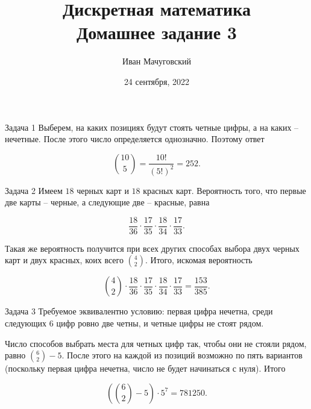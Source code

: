 \documentclass{article}
\date{24 сентября, 2022}
\title{Дискретная математика \\ \Large Домашнее задание 3}
\author{Иван Мачуговский}
\begin{document}
	\maketitle

	\begin{section}{Задача 1}
		Выберем, на каких позициях будут стоять четные цифры, а на каких -- нечетные. После этого число определяется однозначно. Поэтому ответ

		\begin{equation*}
			\binom{10}{5} = \frac{10!}{(5!)^2} = 252.
		\end{equation*}
	\end{section}

	\begin{section}{Задача 2}
		Имеем $18$ черных карт и $18$ красных карт. Вероятность того, что первые две карты -- черные, а следующие две -- красные, равна

		\begin{equation*}
			\frac{18}{36} \cdot \frac{17}{35} \cdot \frac{18}{34} \cdot \frac{17}{33}.
		\end{equation*}

		Такая же вероятность получится при всех других способах выбора двух черных карт и двух красных, коих всего $\binom{4}{2}$. Итого, искомая вероятность

		\begin{equation*}
			\binom{4}{2} \cdot \frac{18}{36} \cdot \frac{17}{35} \cdot \frac{18}{34} \cdot \frac{17}{33} = \frac{153}{385}.
		\end{equation*}
	\end{section}

	\begin{section}{Задача 3}
		Требуемое эквивалентно условию: первая цифра нечетна, среди следующих 6 цифр ровно две четны, и четные цифры не стоят рядом.

		Число способов выбрать места для четных цифр так, чтобы они не стояли рядом, равно $\binom{6}{2} - 5$. После этого на каждой из позиций возможно по пять вариантов (поскольку первая цифра нечетна, число не будет начинаться с нуля). Итого

		\begin{equation*}
			\left( \binom{6}{2} - 5 \right) \cdot 5^7 = 781250.
		\end{equation*}
	\end{section}
\end{document}
